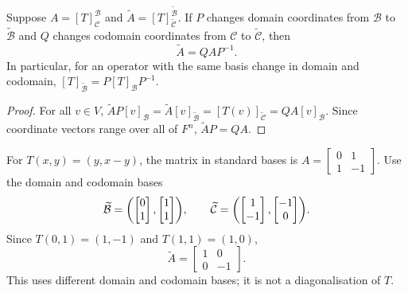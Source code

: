 \begin{Theorem}\label{thm:ChangeBasis}
Suppose $A=[T]_{\mathcal C}^{\mathcal B}$ and $\widetilde A=[T]_{\widetilde{\mathcal C}}^{\widetilde{\mathcal B}}$. If $P$ changes domain coordinates from $\mathcal B$ to $\widetilde{\mathcal B}$ and $Q$ changes codomain coordinates from $\mathcal C$ to $\widetilde{\mathcal C}$, then
\begin{equation*}
\widetilde A=QAP^{-1}.
\end{equation*}
In particular, for an operator with the same basis change in domain and codomain, $[T]_{\widetilde{\mathcal B}}=P[T]_{\mathcal B}P^{-1}$.
\end{Theorem}
\begin{proof}
For all $v\in V$, $\widetilde A P[v]_{\mathcal B}=\widetilde A[v]_{\widetilde{\mathcal B}}=[T(v)]_{\widetilde{\mathcal C}}=QA[v]_{\mathcal B}$. Since coordinate vectors range over all of $F^n$, $\widetilde A P=QA$.
\end{proof}

\begin{Example}
For $T(x,y)=(y,x-y)$, the matrix in standard bases is $A=\begin{bmatrix}0&1\\1&-1\end{bmatrix}$. Use the domain and codomain bases
\begin{equation*}
\widetilde{\mathcal B}=\pqty{\begin{bmatrix}0\\1\end{bmatrix},\begin{bmatrix}1\\1\end{bmatrix}},\qquad \widetilde{\mathcal C}=\pqty{\begin{bmatrix}1\\-1\end{bmatrix},\begin{bmatrix}-1\\0\end{bmatrix}}.
\end{equation*}
Since $T(0,1)=(1,-1)$ and $T(1,1)=(1,0)$,
\begin{equation*}
\widetilde A=\begin{bmatrix}1&0\\0&-1\end{bmatrix}.
\end{equation*}
This uses different domain and codomain bases; it is not a diagonalisation of $T$.
\end{Example}

